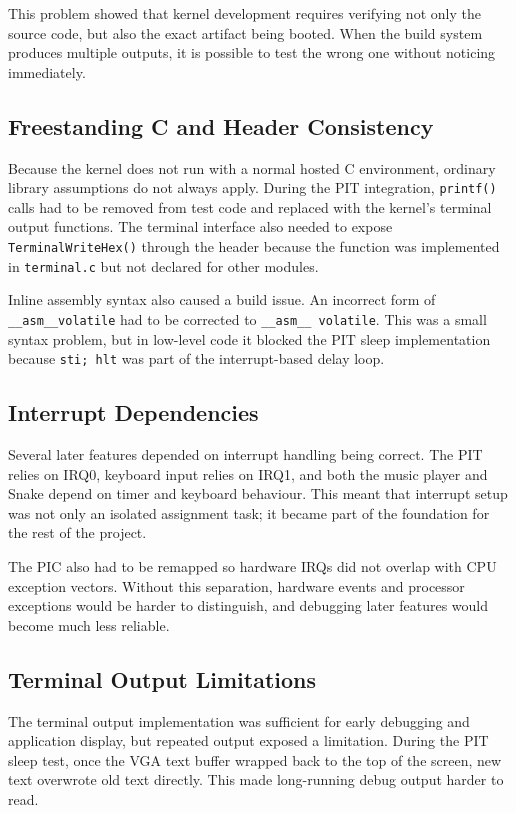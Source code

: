 This problem showed that kernel development requires verifying not only the source code, but also the exact artifact being booted. When the build system produces multiple outputs, it is possible to test the wrong one without noticing immediately.

\subsection{Freestanding C and Header Consistency}
Because the kernel does not run with a normal hosted C environment, ordinary library assumptions do not always apply. During the PIT integration, \texttt{printf()} calls had to be removed from test code and replaced with the kernel's terminal output functions. The terminal interface also needed to expose \texttt{TerminalWriteHex()} through the header because the function was implemented in \texttt{terminal.c} but not declared for other modules.

Inline assembly syntax also caused a build issue. An incorrect form of \texttt{\_\_asm\_\_volatile} had to be corrected to \texttt{\_\_asm\_\_ volatile}. This was a small syntax problem, but in low-level code it blocked the PIT sleep implementation because \texttt{sti; hlt} was part of the interrupt-based delay loop.

\subsection{Interrupt Dependencies}
Several later features depended on interrupt handling being correct. The PIT relies on IRQ0, keyboard input relies on IRQ1, and both the music player and Snake depend on timer and keyboard behaviour. This meant that interrupt setup was not only an isolated assignment task; it became part of the foundation for the rest of the project.

The PIC also had to be remapped so hardware IRQs did not overlap with CPU exception vectors. Without this separation, hardware events and processor exceptions would be harder to distinguish, and debugging later features would become much less reliable.

\subsection{Terminal Output Limitations}
The terminal output implementation was sufficient for early debugging and application display, but repeated output exposed a limitation. During the PIT sleep test, once the VGA text buffer wrapped back to the top of the screen, new text overwrote old text directly. This made long-running debug output harder to read.

